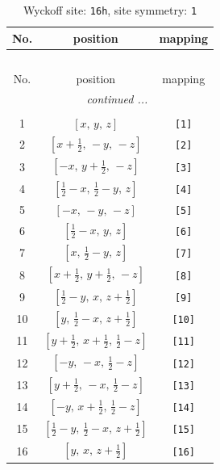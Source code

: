 \documentclass[fleqn,8pt]{jsarticle}
\begin{document}
\begin{longtable}{ccc}
\caption{Wyckoff site: {\tt 16h}, site symmetry: {\tt 1}}
 \\
 \hline \hline
No. & position & mapping \\ \hline \endfirsthead

\multicolumn{2}{l}{\tablename\ \thetable{}} \\
 \hline \hline
No. & position & mapping \\ \hline \endhead

 \hline \hline
\multicolumn{2}{r}{\footnotesize\it continued ...} \\ \endfoot

 \hline \hline
\multicolumn{2}{r}{} \\ \endlastfoot

1 & $\left[ x,\, y,\, z \right]$ & {\tt [1]} \\ \hline
2 & $\left[ x + \frac{1}{2},\, - y,\, - z \right]$ & {\tt [2]} \\ \hline
3 & $\left[ - x,\, y + \frac{1}{2},\, - z \right]$ & {\tt [3]} \\ \hline
4 & $\left[ \frac{1}{2} - x,\, \frac{1}{2} - y,\, z \right]$ & {\tt [4]} \\ \hline
5 & $\left[ - x,\, - y,\, - z \right]$ & {\tt [5]} \\ \hline
6 & $\left[ \frac{1}{2} - x,\, y,\, z \right]$ & {\tt [6]} \\ \hline
7 & $\left[ x,\, \frac{1}{2} - y,\, z \right]$ & {\tt [7]} \\ \hline
8 & $\left[ x + \frac{1}{2},\, y + \frac{1}{2},\, - z \right]$ & {\tt [8]} \\ \hline
9 & $\left[ \frac{1}{2} - y,\, x,\, z + \frac{1}{2} \right]$ & {\tt [9]} \\ \hline
10 & $\left[ y,\, \frac{1}{2} - x,\, z + \frac{1}{2} \right]$ & {\tt [10]} \\ \hline
11 & $\left[ y + \frac{1}{2},\, x + \frac{1}{2},\, \frac{1}{2} - z \right]$ & {\tt [11]} \\ \hline
12 & $\left[ - y,\, - x,\, \frac{1}{2} - z \right]$ & {\tt [12]} \\ \hline
13 & $\left[ y + \frac{1}{2},\, - x,\, \frac{1}{2} - z \right]$ & {\tt [13]} \\ \hline
14 & $\left[ - y,\, x + \frac{1}{2},\, \frac{1}{2} - z \right]$ & {\tt [14]} \\ \hline
15 & $\left[ \frac{1}{2} - y,\, \frac{1}{2} - x,\, z + \frac{1}{2} \right]$ & {\tt [15]} \\ \hline
16 & $\left[ y,\, x,\, z + \frac{1}{2} \right]$ & {\tt [16]} \\
\end{longtable}
\end{document}
